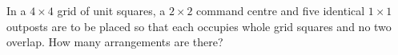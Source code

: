 In a $4\times4$ grid of unit squares, a $2\times2$ command centre and five identical $1\times1$ outposts are to be placed so that each occupies whole grid squares and no two overlap. How many arrangements are there?
